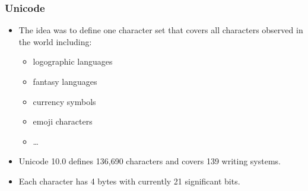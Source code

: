 \documentclass[a4paper, 11pt, accentcolor = tud3b]{tudreport}
\begin{document}
                \subsubsection{Unicode} %
                    \begin{itemize}
                    	\item The idea was to define one character set that covers all characters observed in the world including:
                    		\begin{itemize}
                    			\item logographic languages
                    			\item fantasy languages
                    			\item currency symbols
                    			\item emoji characters
                    			\item \dots
                    		\end{itemize}
                    	\item Unicode 10.0 defines 136,690 characters and covers 139 writing systems.
                    	\item Each character has 4 bytes with currently 21 significant bits.
                    \end{itemize}
                
\end{document}

